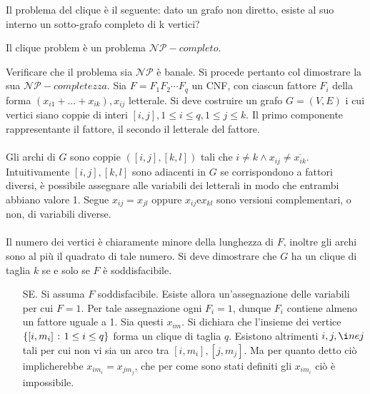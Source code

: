 \documentclass{subfiles}
\begin{document}
Il problema del clique è il seguente: dato un grafo non diretto, esiste al suo interno un sotto-grafo completo di k vertici?

\begin{Theorem}
    Il clique problem è un problema \(\mathcal{NP}-completo\).

    \begin{Proof*}
        Verificare che il problema sia \(\mathcal{NP}\) è banale.
        Si procede pertanto col dimostrare la sua \(\mathcal{NP}-completezza\).
        Sia \(F = F_{1}F_{2} \cdots F_{q}\) un CNF, con ciascun fattore \(F_{i}\) della forma \((x_{i1} + \ldots + x_{ik}), x_{ij}\) letterale.
        Si deve costruire un grafo \(G = (V, E)\) i cui vertici siano coppie di interi \([i, j], 1 \le i \le q, 1 \le j \le k\).
        Il primo componente rappresentante il fattore, il secondo il letterale del fattore.
        \\ \\
        Gli archi di \(G\) sono coppie \(([i, j], [k, l])\) tali che \(i \ne k \land x_{ij} \ne \overline{x_{ik}}\).
        Intuitivamente \([i, j], [k, l]\) sono adiacenti in \(G\) se corrispondono a fattori diversi, è possibile assegnare alle variabili dei letterali in modo che entrambi abbiano valore 1.
        Segue \(x_{ij} = x_{jl}\) oppure \(x_{ij} \text{e} x_{kl}\) sono versioni complementari, o non, di variabili diverse.
        \\ \\
        Il numero dei vertici è chiaramente minore della lunghezza di \(F\), inoltre gli archi sono al più il quadrato di tale numero.
        Si deve dimostrare che \(G\) ha un clique di taglia \(k\) se e solo se \(F\) è soddisfacibile.

        \begin{itemize}
            \item [SE.] Si assuma \(F\) soddisfacibile. Esiste allora un'assegnazione delle variabili per cui \(F = 1\).
                  Per tale assegnazione ogni \(F_{i} = 1\), dunque \(F_{i}\) contiene almeno un fattore uguale a 1. Sia questi \(x_{im}\).
                  Si dichiara che l'insieme dei vertice \(\left\{[i, m_{i}] \operatorname{\: {:} \:} 1 \le i \le q\right\}\) forma un clique di taglia \(q\).
                  Esistono altrimenti \(i, j, \i ne j\) tali per cui non vi sia un arco tra \([i, m_{i}], [j, m_{j}]\).
                  Ma per quanto detto ciò implicherebbe \(x_{im_{i}} = x_{jm_{j}}\), che per come sono stati definiti gli \(x_{im_{i}}\) ciò è impossibile.


\end{itemize}
\end{Proof*}
\end{Theorem}
\end{document}
